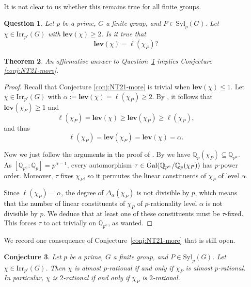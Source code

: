 \documentclass[12pt]{amsart}
\newtheorem{theorem}{Theorem}[section]
\newtheorem{conjecture}[theorem]{Conjecture}
\newtheorem{question}[theorem]{Question}
\theoremstyle{definition}
\numberwithin{equation}{section}
\newcommand{\Irr}{{\mathrm {Irr}}}
\newcommand{\Syl}{{\mathrm {Syl}}}
\newcommand{\Gal}{{\rm Gal}}
\newcommand{\lev}{\mathrm{\mathbf{lev}}}
\begin{document}
It is not clear to us whether this remains true for all finite
groups.

\begin{question}\label{conj:ell}
Let $p$ be a prime, $G$ a finite group, and $P\in\Syl_p(G)$. Let
$\chi\in\Irr_{p'}(G)$ with $\lev(\chi)\geq 2$. Is it true that
\[\lev(\chi)=\ell(\chi_P)?\]
\end{question}

\begin{theorem}\label{thm:1implies3}
An affirmative answer to Question~\ref{conj:ell} implies Conjecture~
\ref{conj:NT21-more}.
\end{theorem}

\begin{proof}
Recall that Conjecture \ref{conj:NT21-more} is trivial when
$\lev(\chi)\leq 1$. Let $\chi\in\Irr_{p'}(G)$ with
$\alpha:=\lev(\chi)=\ell(\chi_P)\geq 2$. By \cite[Lemma~4.2]{HS25},
it follows that $\lev(\chi_P)\geq 1$ and
\[\ell(\chi_P)= \lev(\chi)\geq \lev(\chi_P)\geq \ell(\chi_P),\]
and thus
\[\ell(\chi_P)=\lev(\chi_P)=\lev(\chi)=\alpha.\]

Now we just follow the arguments in the proof of
\cite[Theorem~4.4]{HS25}. By \cite[Lemma~7.1]{Navarro-Tiep21} we
have $\mathbb{Q}_p(\chi_P) \subseteq \mathbb{Q}_{p^\alpha}$. As
$[\mathbb{Q}_{p^\alpha} : \mathbb{Q}_p] = p^{\alpha-1}$, every
automorphism $\tau \in
\Gal(\mathbb{Q}_{p^\alpha}/\mathbb{Q}_p(\chi_P))$ has $p$-power
order. Moreover, $\tau$ fixes $\chi_P$, so it permutes the linear
constituents of $\chi_P$ of level $\alpha$.

Since $\ell(\chi_P) = \alpha$, the degree of $\Delta_\alpha(\chi_P)$
is not divisible by $p$, which means that the number of linear
constituents of $\chi_P$ of $p$-rationality level $\alpha$ is not
divisible by $p$. We deduce that at least one of these constituents
must be $\tau$-fixed. This forces $\tau$ to act trivially on
$\mathbb{Q}_{p^\alpha}$, as wanted.
\end{proof}

We record one consequence of Conjecture~\ref{conj:NT21-more} that is
still open.

\begin{conjecture}\label{conj:NT21-more-more}
Let $p$ be a prime, $G$ a finite group, and $P\in\Syl_p(G)$. Let
$\chi\in\Irr_{p'}(G)$. Then $\chi$ is almost $p$-rational if and
only if $\chi_P$ is almost $p$-rational. In particular, $\chi$ is
$2$-rational if and only if $\chi_P$ is $2$-rational.
\end{conjecture}
\end{document}
